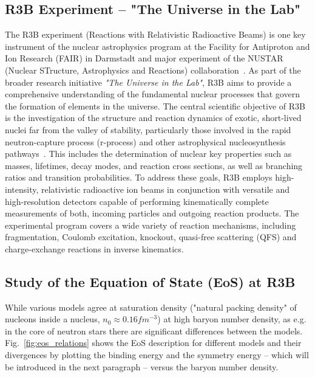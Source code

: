\subsection{R3B Experiment -- "The Universe in the Lab"}
The R3B experiment (Reactions with Relativistic Radioactive Beams) is one key instrument of the nuclear astrophysics program at the Facility for Antiproton and Ion Research (FAIR) in Darmstadt and major experiment of the NUSTAR (Nuclear STructure, Astrophysics and Reactions) collaboration~\cite{krucken2005nustar}.\newline
As part of the broader research initiative \textit{"The Universe in the Lab"}, R3B aims to provide a comprehensive understanding of the fundamental nuclear processes that govern the formation of elements in the universe.\newline
The central scientific objective of R3B is the investigation of the structure and reaction dynamics of exotic, short-lived nuclei far from the valley of stability, particularly those involved in the rapid neutron-capture process (r-process) and other astrophysical nucleosynthesis pathways~\cite{horowitz2019r}. This includes the determination of nuclear key properties such as masses, lifetimes, decay modes, and reaction cross sections, as well as branching ratios and transition probabilities.\newline
To address these goals, R3B employs high-intensity, relativistic radioactive ion beams in conjunction with versatile and high-resolution detectors capable of performing kinematically complete measurements of both, incoming particles and outgoing reaction products. The experimental program covers a wide variety of reaction mechanisms, including fragmentation, Coulomb excitation, knockout, quasi-free scattering (QFS) and charge-exchange reactions in inverse kinematics.\newline

\subsection{Study of the Equation of State (EoS) at R3B}

While various models agree at saturation density ("natural packing density" of nucleons inside a nucleus, $n_0 \approx 0.16 fm^{-3}$) at high baryon number density, as e.g. in the core of neutron stars there are significant differences between the models. Fig.~\ref{fig:eos_relations} shows the EoS description for different models and their divergences by plotting the binding energy and the symmetry energy -- which will be introduced in the next paragraph -- versus the baryon number density. 

